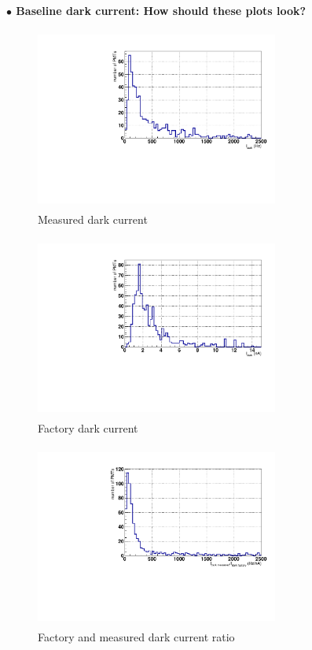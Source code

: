 \textbf{\color[rgb]{1,0.5,0} $\bullet$ Baseline dark current: How should these plots look?}\\
\begin{figure}[ht!]
\centerline{\includegraphics[width=8cm,height=6cm]{ye/fig_ye_pmt_test/dark_curr_measured.pdf}}
\caption{Measured dark current }
\label{f:dark_measure}
\end{figure}

\begin{figure}[ht!]
\centerline{\includegraphics[width=8cm,height=6cm]{ye/fig_ye_pmt_test/dark_curr_factory.pdf}}
\caption{Factory dark current }
\label{f:dark_factory}
\end{figure}

\begin{figure}[ht!]
\centerline{\includegraphics[width=8cm,height=6cm]{ye/fig_ye_pmt_test/dark_curr_ratio.pdf}}
\caption{Factory and measured dark current ratio }
\label{f:dark_ratio}
\end{figure}

